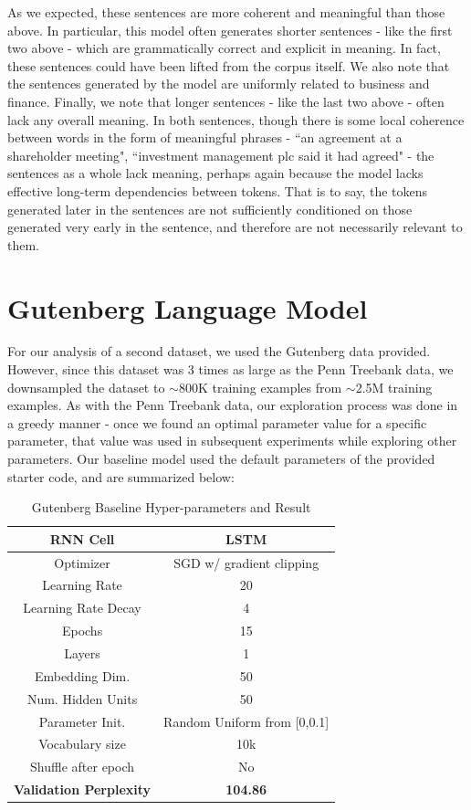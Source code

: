 \documentclass[a4paper]{article}
\begin{document}
As we expected, these sentences are more coherent and meaningful than those above. In particular, this model often generates shorter sentences - like the first two above - which are grammatically correct and explicit in meaning. In fact, these sentences could have been lifted from the corpus itself. We also note that the sentences generated by the model are uniformly related to business and finance. Finally, we note that longer sentences - like the last two above - often lack any overall meaning. In both sentences, though there is some local coherence between words in the form of meaningful phrases - ``an agreement at a shareholder meeting", ``investment management plc said it had agreed" -  the sentences as a whole lack meaning, perhaps again because the model lacks effective long-term dependencies between tokens. That is to say, the tokens generated later in the sentences are not sufficiently conditioned on those generated very early in the sentence, and therefore are not necessarily relevant to them.

\section*{Gutenberg Language Model}
For our analysis of a second dataset, we used the Gutenberg data provided. However, since this dataset was 3 times as large as the Penn Treebank data, we downsampled the dataset to $\sim$800K training examples from $\sim$2.5M training examples. As with the Penn Treebank data, our exploration process was done in a greedy manner - once we found an optimal parameter value for a specific parameter, that value was used in subsequent experiments while exploring other parameters. Our baseline model used the default parameters of the provided starter code, and are summarized below:

\begin{table}[H]
\centering
\begin{tabular}{|c | c|} 
 \hline
RNN Cell & LSTM\\ \hline
Optimizer & SGD w/ gradient clipping \\ \hline
Learning Rate & 20 \\ \hline
Learning Rate Decay & 4 \\ \hline
Epochs & 15\\ \hline
Layers & 1\\ \hline
Embedding Dim. & 50\\ \hline
Num. Hidden Units & 50\\ \hline
Parameter Init. & Random Uniform from [0,0.1]\\ \hline
Vocabulary size & 10k\\ \hline
Shuffle after epoch & No \\ \hline
\textbf{Validation Perplexity} &\textbf{104.86} \\ \hline
\end{tabular}
\caption{Gutenberg Baseline Hyper-parameters and Result}
\label{table:1}
\end{table}
\end{document}
